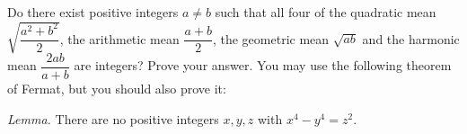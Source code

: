 Do there exist positive integers $a\ne b$ such that all four of the quadratic mean $\sqrt{\dfrac{a^2+b^2}{2}}$, the arithmetic mean $\dfrac{a+b}{2}$, the geometric mean $\sqrt{ab}$ and the harmonic mean $\dfrac{2ab}{a+b}$ are integers? Prove your answer. You may use the following theorem of Fermat, but you should also prove it:

\emph{Lemma.} There are no positive integers $x,y,z$ with $x^4-y^4=z^2$.
